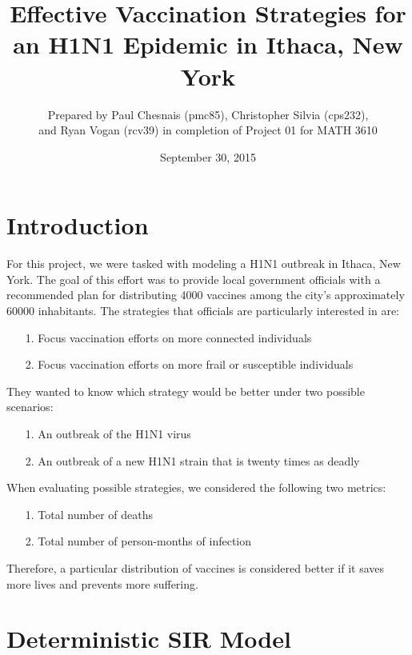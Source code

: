 \documentclass[titlepage]{article}
\title{Effective Vaccination Strategies for an H1N1 Epidemic in Ithaca, New York}
\author{Prepared by Paul Chesnais (pmc85), Christopher Silvia (cps232), \\ and Ryan Vogan (rcv39) in completion of Project 01 for MATH 3610}
\date{September 30, 2015}
\begin{document}
\maketitle
\thispagestyle{fancy}

\section{Introduction}
	For this project, we were tasked with modeling a H1N1 outbreak in Ithaca, New York. The goal of this effort was to provide local government officials with a recommended plan for distributing 4000 vaccines among the city's approximately 60000 inhabitants. The strategies that officials are particularly interested in are:
	\begin{itemize}
		\item[1.]
			Focus vaccination efforts on more connected individuals
		\item[2.]
			Focus vaccination efforts on more frail or susceptible individuals
	\end{itemize}
	They wanted to know which strategy would be better under two possible scenarios:
	\begin{itemize}
		\item[1.]
			An outbreak of the H1N1 virus
		\item[2.]
			An outbreak of a new H1N1 strain that is twenty times as deadly
	\end{itemize}
	When evaluating possible strategies, we considered the following two metrics:
	\begin{itemize}
		\item[1.]
			Total number of deaths
		\item[2.]
			Total number of person-months of infection
	\end{itemize}
	Therefore, a particular distribution of vaccines is considered better if it saves more lives and prevents more suffering. 

\section{Deterministic SIR Model}
\end{document}
